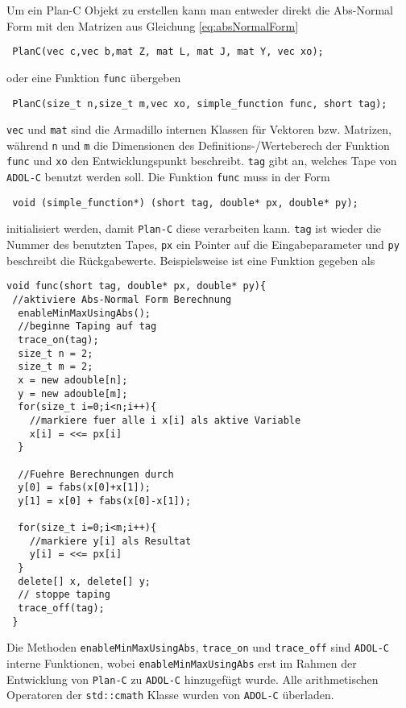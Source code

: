 Um ein Plan-C Objekt zu erstellen kann man entweder direkt die Abs-Normal Form mit den Matrizen aus Gleichung  \eqref{eq:absNormalForm} 
\begin{lstlisting}
 PlanC(vec c,vec b,mat Z, mat L, mat J, mat Y, vec xo);
\end{lstlisting}
oder eine Funktion \texttt{func} übergeben
\begin{lstlisting}
 PlanC(size_t n,size_t m,vec xo, simple_function func, short tag);
\end{lstlisting}
\texttt{vec} und \texttt{mat} sind die Armadillo internen Klassen für Vektoren bzw. Matrizen, während \texttt{n} und \texttt{m} die Dimensionen des Definitions-/Werteberech der Funktion \texttt{func} und \texttt{xo} den Entwicklungspunkt beschreibt. \texttt{tag} gibt an, welches Tape von \texttt{ADOL-C} benutzt werden soll. 
Die Funktion \texttt{func} muss in der Form 
\begin{lstlisting}
 void (simple_function*) (short tag, double* px, double* py);
\end{lstlisting}
initialisiert werden, damit \texttt{Plan-C} diese verarbeiten kann. \texttt{tag} ist wieder die Nummer des benutzten Tapes,  \texttt{px} ein Pointer auf die Eingabeparameter und \texttt{py} beschreibt die Rückgabewerte. 
Beispielsweise ist eine Funktion gegeben als
\begin{lstlisting}[caption=Beispiel einer simple\_function,label=lst:simpleFunc]
 void func(short tag, double* px, double* py){
 //aktiviere Abs-Normal Form Berechnung
  enableMinMaxUsingAbs();
  //beginne Taping auf tag
  trace_on(tag);
  size_t n = 2;
  size_t m = 2;
  x = new adouble[n];
  y = new adouble[m];
  for(size_t i=0;i<n;i++){
    //markiere fuer alle i x[i] als aktive Variable
    x[i] = <<= px[i]		
  }
  
  //Fuehre Berechnungen durch
  y[0] = fabs(x[0]+x[1]);
  y[1] = x[0] + fabs(x[0]-x[1]);
  
  for(size_t i=0;i<m;i++){
    //markiere y[i] als Resultat
    y[i] = <<= px[i]		
  }
  delete[] x, delete[] y;
  // stoppe taping
  trace_off(tag); 
 }
\end{lstlisting}

Die Methoden \texttt{enableMinMaxUsingAbs}, \texttt{trace\_on} und \texttt{trace\_off} sind \texttt{ADOL-C} interne Funktionen, wobei \texttt{enableMinMaxUsingAbs} erst im Rahmen der Entwicklung von \texttt{Plan-C} zu \texttt{ADOL-C} hinzugefügt wurde. Alle arithmetischen Operatoren der \texttt{std::cmath} Klasse wurden von \texttt{ADOL-C} überladen.

